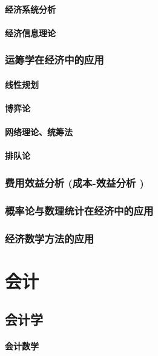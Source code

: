 \documentclass[UTF8]{../../RepresentationUniverse}
\begin{document}
        \subsubsection{经济系统分析}
        \subsubsection{经济信息理论}
    \subsection{运筹学在经济中的应用}
        \subsubsection{线性规划}
        \subsubsection{博弈论}
        \subsubsection{网络理论、统筹法}
        \subsubsection{排队论}
    \subsection{费用效益分析 (成本-效益分析 )}
    \subsection{概率论与数理统计在经济中的应用}
    \subsection{经济数学方法的应用}




\chapter{会计}
\section{会计学}
    \subsubsection{会计数学}
\end{document}
